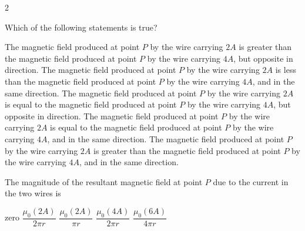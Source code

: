 \documentclass{../../oss-apphys-exam}
\begin{document}
\begin{multicols*}{2}
\begin{questions}
    \question Which of the following statements is true?
    \begin{choices}
      \choice The magnetic field produced at point $P$ by the wire carrying
      $2A$ is greater than the magnetic field produced at point $P$ by the wire
      carrying $4A$, but opposite in direction.
      \choice The magnetic field produced at point $P$ by the wire carrying
      $2A$ is less than the magnetic field produced at point $P$ by the wire
      carrying $4A$, and in the same direction.
      \choice The magnetic field produced at point $P$ by the wire carrying
      $2A$ is equal to the magnetic field produced at point $P$ by the wire
      carrying $4A$, but opposite in direction.
      \choice The magnetic field produced at point $P$ by the wire carrying
      $2A$ is equal to the magnetic field produced at point $P$ by the wire
      carrying $4A$, and in the same direction.
      \choice The magnetic field produced at point $P$ by the wire carrying
      $2A$ is greater than the magnetic field produced at point $P$ by the wire
      carrying $4A$, and in the same direction.
    \end{choices}
    \label{q:2wires1}
    
    \question The magnitude of the resultant magnetic field at point $P$ due to
    the current in the two wires is
    \begin{choices}
      \choice zero
      \choice $\dfrac{\mu_0(2A)}{2\pi r}$
      \choice $\dfrac{\mu_0(2A)}{\pi r}$
      \choice $\dfrac{\mu_0(4A)}{2\pi r}$
      \choice $\dfrac{\mu_0(6A)}{4\pi r}$
    \end{choices}
    \label{q:2wires2}

    

\end{questions}
\end{multicols*}
\end{document}
